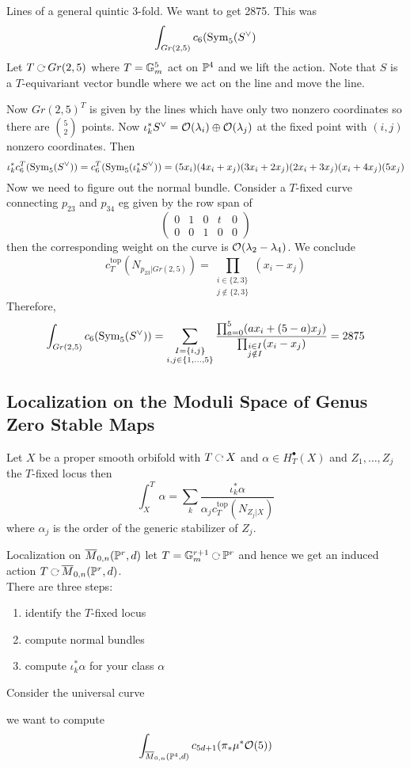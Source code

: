 \documentclass[12pt]{article}
\begin{document}
\begin{example}
Lines of a general quintic 3-fold. We want to get 2875. This was
\[ \int_{Gr(2,5)} c_6(\Sym{5}{S^\vee} \]
Let $T \acts Gr(2,5)$ where $T = \Gm^5$ act on $\P^4$ and we lift the action. 
Note that $S$ is a $T$-equivariant vector bundle where we act on the line and move the line. 
\par
Now $Gr(2,5)^T$ is given by the lines which have only two nonzero coordinates so there are ${5 \choose 2}$ points. Now $\iota^*_k S^\vee = \struct{}(\lambda_i) \oplus \struct{}(\lambda_j)$ at the fixed point with $(i,j)$ nonzero coordinates. Then 
\[ \iota^*_k c_6^T(\Sym{5}{S^\vee}) = c_6^T(\Sym{5}{\iota^*_k S^\vee}) = (5 x_i) (4 x_i + x_j) (3 x_i + 2 x_j) (2 x_i + 3 x_j) (x_i + 4 x_j) (5 x_j) \]
Now we need to figure out the normal bundle. Consider a $T$-fixed curve connecting $p_{23}$ and $p_{34}$ eg given by the row span of
\[ \begin{pmatrix}
0 & 1 & 0 & t & 0
\\
0 & 0 & 1 & 0 & 0 
\end{pmatrix} \]
then the corresponding weight on the curve is $\struct{}(\lambda_2 - \lambda_4)$. We conclude
\[ c^{\text{top}}_T(N_{p_{23}|Gr(2,5)}) = \prod_{\substack{ i \in \{ 2, 3 \} \\ j \notin \{ 2, 3 \} }} (x_i - x_j) \]
Therefore,
\[ \int_{Gr(2,5)} c_6(\Sym{5}{S^\vee}) = \sum_{\substack{I = \{ i, j \} \\ i,j \in \{ 1,  \dots, 5 \}}} \frac{\prod_{a = 0}^5 (a x_i + (5 - a) x_j)}{\prod_{\substack{i \in I \\ j \notin I}} (x_i - x_j)} = 2875 \]
\end{example} 

\subsection{Localization on the Moduli Space of Genus Zero Stable Maps}

\begin{thm}
Let $X$ be a proper smooth orbifold with $T \acts X$ and $\alpha \in H_T^\bullet(X)$ and $Z_1, \dots, Z_j$ the $T$-fixed locus then
\[ \int_X^T \alpha = \sum_k \frac{\iota^*_k \alpha}{\alpha_j c^{\text{top}}_T(N_{Z_j|X})}  \]
where $\alpha_j$ is the order of the generic stabilizer of $Z_j$. 
\end{thm}

Localization on $\ol{M}_{0,n}(\P^r, d)$ let $T = \Gm^{r+1} \acts \P^r$ and hence we get an induced action $T \acts \ol{M}_{0,n}(\P^r, d)$. 
\bigskip\\
There are three steps:
\begin{enumerate}
\item identify the $T$-fixed locus 
\item compute normal bundles
\item compute $\iota^*_k \alpha$ for your class $\alpha$
\end{enumerate}

Consider the universal curve
\begin{center}
\end{center}
we want to compute
\[ \int_{\ol{M}_{0,n}(\P^4, d)} c_{5 d + 1}(\pi_* \mu^* \struct{}(5)) \]
\end{document}
